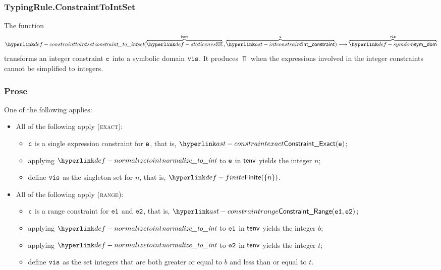 \subsubsection{TypingRule.ConstraintToIntSet \label{sec:TypingRule.ConstraintToIntSet}}
\hypertarget{def-constrainttointset}{}
The function
\[
  \constrainttointset(
    \overname{\staticenvs}{\tenv} \aslsep
    \overname{\intconstraint}{\vc}
  ) \aslto
  \overname{\symdom}{\vis}
\]
transforms an integer constraint $\texttt{c}$ into a symbolic domain $\texttt{vis}$.
It produces $\Top$ when the expressions involved in the integer constraints cannot be simplified
to integers.

\subsubsection{Prose}
One of the following applies:
\begin{itemize}
  \item All of the following apply (\textsc{exact}):
  \begin{itemize}
    \item $\texttt{c}$ is a single expression constraint for $\texttt{e}$, that is, $\ConstraintExact(\ve)$;
    \item applying $\normalizetoint$ to $\texttt{e}$ in $\textsf{tenv}$ yields the integer $n$\ProseTerminateAs{\Top};
    \item define $\texttt{vis}$ as the singleton set for $n$, that is, $\Finite(\{n\})$.
  \end{itemize}

  \item All of the following apply (\textsc{range}):
  \begin{itemize}
    \item $\texttt{c}$ is a range constraint for $\texttt{e1}$ and $\texttt{e2}$, that is, $\ConstraintRange(\veone, \vetwo)$;
    \item applying $\normalizetoint$ to $\texttt{e1}$ in $\textsf{tenv}$ yields the integer $b$\ProseTerminateAs{\Top};
    \item applying $\normalizetoint$ to $\texttt{e2}$ in $\textsf{tenv}$ yields the integer $t$\ProseTerminateAs{\Top};
    \item define $\texttt{vis}$ as the set integers that are both greater or equal to $b$ and less than or equal to $t$.
  \end{itemize}
\end{itemize}

